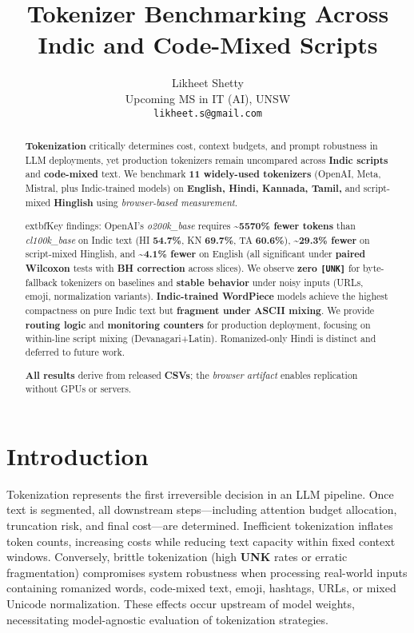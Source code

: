 \documentclass{article}
\title{Tokenizer Benchmarking Across Indic and Code-Mixed Scripts}
\author{Likheet Shetty \\ Upcoming MS in IT (AI), UNSW \\\texttt{likheet.s@gmail.com}}
\date{}
\begin{document}
\sloppy
\maketitle


\begin{abstract}
\textbf{Tokenization} critically determines cost, context budgets, and prompt robustness in LLM deployments, yet production tokenizers remain uncompared across \textbf{Indic scripts} and \textbf{code-mixed} text. We benchmark \textbf{11 widely-used tokenizers} (OpenAI, Meta, Mistral, plus Indic-trained models) on \textbf{English, Hindi, Kannada, Tamil,} and script-mixed \textbf{Hinglish} using \textit{browser-based measurement}.

	extbf{Key findings:} OpenAI's \textit{o200k\_base} requires \textbf{\textasciitilde55\textendash{}70\% fewer tokens} than \textit{cl100k\_base} on Indic text (HI \textbf{54.7\%}, KN \textbf{69.7\%}, TA \textbf{60.6\%}), \textbf{\textasciitilde29.3\% fewer} on script-mixed Hinglish, and \textbf{\textasciitilde4.1\% fewer} on English (all significant under \textbf{paired Wilcoxon} tests with \textbf{BH correction} across slices). We observe \textbf{zero \texttt{[UNK]}} for byte-fallback tokenizers on baselines and \textbf{stable behavior} under noisy inputs (URLs, emoji, normalization variants). \textbf{Indic-trained WordPiece} models achieve the highest compactness on pure Indic text but \textbf{fragment under ASCII mixing}. We provide \textbf{routing logic} and \textbf{monitoring counters} for production deployment, focusing on within-line script mixing (Devanagari+Latin). Romanized-only Hindi is distinct and deferred to future work.

\textbf{All results} derive from released \textbf{CSVs}; the \textit{browser artifact} enables replication without GPUs or servers.
\end{abstract}



\section{Introduction}

Tokenization represents the first irreversible decision in an LLM pipeline. Once text is segmented, all downstream steps---including attention budget allocation, truncation risk, and final cost---are determined. Inefficient tokenization inflates token counts, increasing costs while reducing text capacity within fixed context windows. Conversely, brittle tokenization (high \textbf{UNK} rates or erratic fragmentation) compromises system robustness when processing real-world inputs containing romanized words, code-mixed text, emoji, hashtags, URLs, or mixed Unicode normalization. These effects occur upstream of model weights, necessitating model-agnostic evaluation of tokenization strategies.
\end{document}
